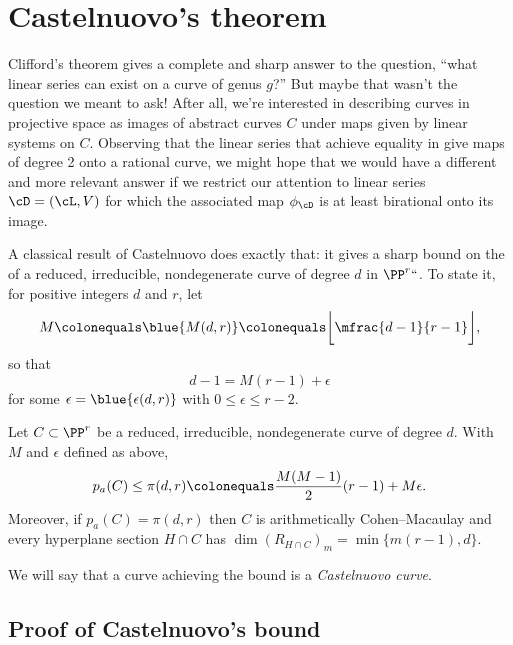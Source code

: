  \section{Castelnuovo's theorem}\label{CastelnuovoSection}

Clifford's theorem gives a complete and sharp answer to the question,
%
``what linear series can exist on a curve of genus $g$?''
But maybe that wasn't the question we meant to ask! After all, we're
interested in describing curves in projective space as images of abstract
curves $C$ under maps given by linear systems on $C$. Observing that
the linear series that achieve equality in 
%
give maps of degree 2 onto a rational curve,
 we might hope that we
would have a 
 different and more relevant
answer if we
restrict our attention to linear series $\cD = (\cL,V)$ for which the
%
associated map $\phi_\cD$ is at least  birational onto its image.

A classical result of Castelnuovo does exactly that: it gives a sharp
bound on the 
%
of a reduced, irreducible, nondegenerate
curve of degree $d$ in $\PP^r` `$. To state it, for positive integers $d$
and $r$, let
%
\begin{equation}\label{def of M}
 M \colonequals  
\blue{M(d,r)}
\colonequals  
\biggl\lfloor\mfrac{d-1}{r-1}\biggr\rfloor,
\end{equation}
so that
$$
 d -1 = M(r-1) + \epsilon
$$ 
for some $\epsilon = 
\blue{\epsilon(d,r)}
$
 with $0 \leq \epsilon \leq r-2$.
%

\begin{theorem}\label{Castelnuovo's bound}
Let $C \subset \PP^r$ be a reduced, irreducible, nondegenerate curve of
%
degree $d$. With $M$ and $\epsilon$ defined
as above,
$$
p_a(C) \leq \pi(d,r) \colonequals  \frac{M(M-1)}{2}(r-1) + M\epsilon.
$$
Moreover, if $p_a(C) = \pi(d,r)$  then $C$ is arithmetically
%
Cohen--Macaulay and every hyperplane
section $H\cap C$ has 
%
$
\dim (R_{H\cap C})_{m} = \min\{m(r-1), d\}.
$
\end{theorem}

We will say that a curve achieving the bound is a \emph{Castelnuovo
%
curve}.

\subsection*{Proof of Castelnuovo's bound}

